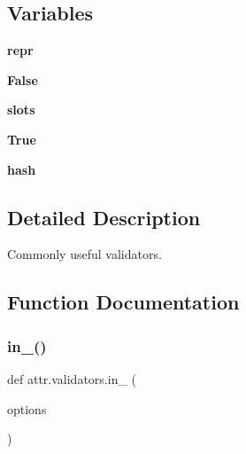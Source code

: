 \subsection*{Variables}
\begin{DoxyCompactItemize}
\item 
\mbox{\label{namespaceattr_1_1validators_a4069e1f07a178929f378b9147da0f3ed}} 
{\bfseries repr}
\item 
\mbox{\label{namespaceattr_1_1validators_ab037f397d327a849a088df327de0909f}} 
{\bfseries False}
\item 
\mbox{\label{namespaceattr_1_1validators_addf1d308937debd0471b4604ea6e924f}} 
{\bfseries slots}
\item 
\mbox{\label{namespaceattr_1_1validators_aebd43c74052e92f3b52a26b5bea440a4}} 
{\bfseries True}
\item 
\mbox{\label{namespaceattr_1_1validators_af753c568bd92ed832c0bb06df5ec3e27}} 
{\bfseries hash}
\end{DoxyCompactItemize}


\subsection{Detailed Description}
\begin{DoxyVerb}Commonly useful validators.
\end{DoxyVerb}
 

\subsection{Function Documentation}
\mbox{\label{namespaceattr_1_1validators_ac9b231e7f5f70770d16101e73635934e}} 
\subsubsection{\texorpdfstring{in\+\_\+()}{in\_()}}
{\footnotesize\ttfamily def attr.\+validators.\+in\+\_\+ (\begin{DoxyParamCaption}\item[{}]{options }\end{DoxyParamCaption})}

